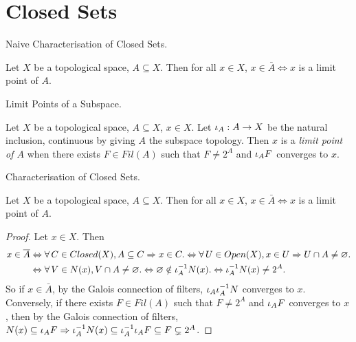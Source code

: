 \documentclass[main.tex]{subfiles}
\begin{document}
\section{Closed Sets}

\begin{rmk} Naive Characterisation of Closed Sets. 
  
  Let $X$ be a topological space, $A \subseteq X$.
  Then for all $x \in X$,
  $x \in \bar{A} \iff x$ is a limit point of $A$.
\end{rmk}

\begin{dfn} Limit Points of a Subspace. 

  Let $X$ be a topological space, $A \subseteq X$, $x \in X$.
  Let $\iota_A : A \to X$ be the natural inclusion,
  continuous by giving $A$ the subspace topology. 
  Then $x$ is a \emph{limit point of $A$} when
  there exists $F \in Fil(A)$ such that 
  $F \neq 2^A$ and $\iota_A F$ converges to $x$.

\end{dfn}

\begin{thm} Characterisation of Closed Sets. 
  
  Let $X$ be a topological space, $A \subseteq X$.
  Then for all $x \in X$,
  $x \in \bar{A} \iff x$ is a limit point of $A$.
\end{thm}
\begin{proof}
  Let $x \in X$.
  Then \begin{align*}
    x \in \overline{A} 
    &\Leftrightarrow \forall\, C \in Closed(X), A \subseteq C \Rightarrow x \in C. 
    \Leftrightarrow \forall\, U \in Open(X), x \in U \Rightarrow U \cap A \neq \varnothing. \\
    &\Leftrightarrow \forall\, V \in N(x), V \cap A \neq \varnothing. 
    \Leftrightarrow \varnothing \notin \iota_A^{-1}N(x). 
    \Leftrightarrow \iota_A^{-1} N(x) \neq 2^A.
  \end{align*}
  So if $x \in \bar{A}$, by the Galois connection of filters,
  $\iota_A\iota_A^{-1}N$ converges to $x$.
  Conversely, if there exists $F\in Fil(A)$ such that 
  $F \neq 2^A$ and $\iota_A F$ converges to $x$,
  then by the Galois connection of filters, 
  $N(x) \subseteq \iota_A F \Rightarrow 
  \iota_A^{-1} N(x) \subseteq \iota_A^{-1}\iota_A F \subseteq F \subsetneq 2^A$. 
\end{proof}
\end{document}
